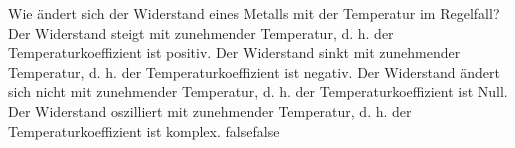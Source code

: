     {Wie ändert sich der Widerstand eines Metalls mit der Temperatur im Regelfall?}
    {Der Widerstand steigt mit zunehmender Temperatur, d. h. der Temperaturkoeffizient ist positiv.}
    {Der Widerstand sinkt mit zunehmender Temperatur, d. h. der Temperaturkoeffizient ist negativ.}
    {Der Widerstand ändert sich nicht mit zunehmender Temperatur, d. h. der Temperaturkoeffizient ist Null.}
    {Der Widerstand oszilliert mit zunehmender Temperatur, d. h. der Temperaturkoeffizient ist komplex.}
    {false}{false}